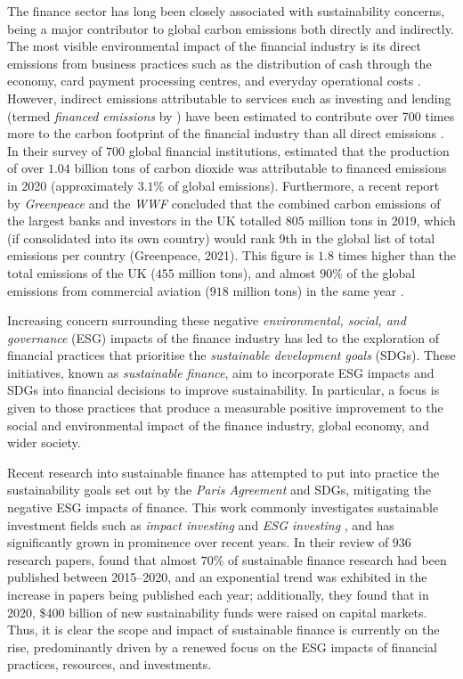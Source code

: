 \documentclass[a4paper, 11pt]{report}
\begin{document}
    The finance sector has long been closely associated with sustainability concerns, being a major contributor to global carbon emissions both directly and indirectly. The most visible environmental impact of the financial industry is its direct emissions from business practices such as the distribution of cash through the economy, card payment processing centres, and everyday operational costs \citep{hanegraaf-2018}. However, indirect emissions attributable to services such as investing and lending (termed \emph{financed emissions} by \citet{power-2020}) have been estimated to contribute over 700 times more to the carbon footprint of the financial industry than all direct emissions \citep{power-2020}. In their survey of $700$ global financial institutions, \citet{power-2020} estimated that the production of over $1.04$ billion tons of carbon dioxide was attributable to financed emissions in 2020 (approximately $3.1\%$ of global emissions). Furthermore, a recent report by \emph{Greenpeace} and the \emph{WWF} concluded that the combined carbon emissions of the largest banks and investors in the UK totalled $805$ million tons in 2019, which (if consolidated into its own country) would rank 9th in the global list of total emissions per country (Greenpeace, 2021). This figure is $1.8$ times higher than the total emissions of the UK ($455$ million tons), and almost $90\%$ of the global emissions from commercial aviation ($918$ million tons) in the same year \citep{graver-2020}.

    Increasing concern surrounding these negative \emph{environmental, social, and governance} (ESG) impacts of the finance industry has led to the exploration of financial practices that prioritise the \emph{sustainable development goals} (SDGs). These initiatives, known as \emph{sustainable finance}, aim to incorporate ESG impacts and SDGs into financial decisions to improve sustainability. In particular, a focus is given to those practices that produce a measurable positive improvement to the social and environmental impact of the finance industry, global economy, and wider society. 

    Recent research into sustainable finance has attempted to put into practice the sustainability goals set out by the \emph{Paris Agreement} and SDGs, mitigating the negative ESG impacts of finance. This work commonly investigates sustainable investment fields such as \emph{impact investing} \citep{agrawal-2021} and \emph{ESG investing} \citep{alessandrini-2020}, and has significantly grown in prominence over recent years. In their review of $936$ research papers, \citet{kumar-2022} found that almost $70\%$ of sustainable finance research had been published between 2015--2020, and an exponential trend was exhibited in the increase in papers being published each year; additionally, they found that in 2020, \$400 billion of new sustainability funds were raised on capital markets. Thus, it is clear the scope and impact of sustainable finance is currently on the rise, predominantly driven by a renewed focus on the ESG impacts of financial practices, resources, and investments.
\end{document}
